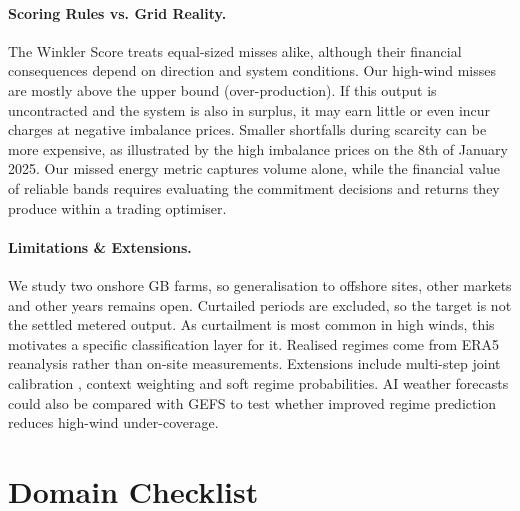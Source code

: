 \documentclass{article}
\begin{document}
\paragraph{Scoring Rules vs. Grid Reality.} The Winkler Score treats equal-sized misses alike, although their financial consequences depend on direction and system conditions. Our high-wind misses are mostly above the upper bound (over-production). If this output is uncontracted and the system is also in surplus, it may earn little or even incur charges at negative imbalance prices. Smaller shortfalls during scarcity can be more expensive, as illustrated by the high imbalance prices on the 8th of January 2025. Our missed energy metric captures volume alone, while the financial value of reliable bands requires evaluating the commitment decisions and returns they produce within a trading optimiser.

\paragraph{Limitations \& Extensions.} We study two onshore GB farms, so generalisation to offshore sites, other markets and other years remains open. Curtailed periods are excluded, so the target is not the settled metered output. As curtailment is most common in high winds, this motivates a specific classification layer for it. Realised regimes come from ERA5 reanalysis rather than on-site measurements. Extensions include multi-step joint calibration \citep{wang2024online}, context weighting \citep{moradi2025enhanced} and soft regime probabilities. AI weather forecasts \citep{bonev2025fourcastnet,weyn2026aurora, alet2026operational} could also be compared with GEFS to test whether improved regime prediction reduces high-wind under-coverage.

\clearpage
\section*{Domain Checklist}
\end{document}

